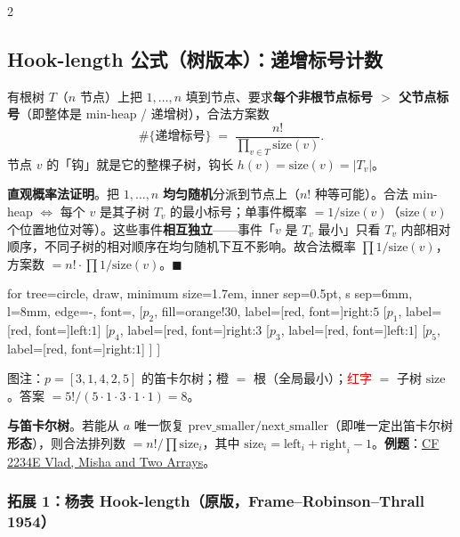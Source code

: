 \begin{multicols*}{2}
		\subsection{Hook-length 公式（树版本）：递增标号计数}

		有根树 $T$（$n$ 节点）上把 $1, \dots, n$ 填到节点、要求\textbf{每个非根节点标号 $>$ 父节点标号}（即整体是 min-heap / 递增树），合法方案数
		\[
			\#\{\text{递增标号}\} \;=\; \frac{n!}{\displaystyle\prod_{v \in T} \mathrm{size}(v)}.
		\]
		节点 $v$ 的「钩」就是它的整棵子树，钩长 $h(v) = \mathrm{size}(v) = |T_v|$。

		\textbf{直观概率法证明}。把 $1, \dots, n$ \textbf{均匀随机}分派到节点上（$n!$ 种等可能）。合法 min-heap $\Longleftrightarrow$ 每个 $v$ 是其子树 $T_v$ 的最小标号；单事件概率 $= 1/\mathrm{size}(v)$（$\mathrm{size}(v)$ 个位置地位对等）。这些事件\textbf{相互独立}——事件「$v$ 是 $T_v$ 最小」只看 $T_v$ 内部相对顺序，不同子树的相对顺序在均匀随机下互不影响。故合法概率 $\prod 1/\mathrm{size}(v)$，方案数 $= n! \cdot \prod 1/\mathrm{size}(v)$。$\blacksquare$

		\begin{center}
		\begin{forest}
			for tree={circle, draw, minimum size=1.7em, inner sep=0.5pt, s sep=6mm, l=8mm, edge={-}, font=\scriptsize},
			[$p_2$, fill=orange!30, label={[red, font=\tiny]right:$5$}
				[$p_1$, label={[red, font=\tiny]left:$1$}]
				[$p_4$, label={[red, font=\tiny]right:$3$}
					[$p_3$, label={[red, font=\tiny]left:$1$}]
					[$p_5$, label={[red, font=\tiny]right:$1$}]
				]
			]
		\end{forest}

		\vspace{2pt}
		{\footnotesize\sffamily\color{gray} 图注：$p = [3, 1, 4, 2, 5]$ 的笛卡尔树；\textcolor{orange!75!black}{橙} $=$ 根（全局最小）；\textcolor{red}{红字} $=$ 子树 $\mathrm{size}$。答案 $= 5!/(5 \cdot 1 \cdot 3 \cdot 1 \cdot 1) = 8$。}
		\end{center}

		\textbf{与笛卡尔树}。若能从 $a$ 唯一恢复 $\mathrm{prev}\_\mathrm{smaller} / \mathrm{next}\_\mathrm{smaller}$（即唯一定出笛卡尔树\textbf{形态}），则合法排列数 $= n! / \prod \mathrm{size}_i$，其中 $\mathrm{size}_i = \mathrm{left}_i + \mathrm{right}_i - 1$。\textbf{例题}：\href{https://codeforces.com/contest/2234/problem/E}{CF 2234E Vlad, Misha and Two Arrays}。

		\subsubsection*{拓展 1：杨表 Hook-length（原版，Frame--Robinson--Thrall 1954）}


\end{multicols*}

